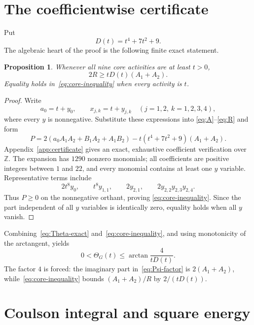 \documentclass[11pt]{article}
\newtheorem{proposition}[theorem]{Proposition}
\theoremstyle{remark}
\begin{document}
\section{The coefficientwise certificate}

Put
\begin{equation}\label{eq:D}
 D(t)=t^4+7t^2+9.
\end{equation}
The algebraic heart of the proof is the following finite exact statement.

\begin{proposition}\label{prop:certificate}
Whenever all nine core activities are at least $t>0$,
\begin{equation}\label{eq:core-inequality}
 2R\geq tD(t)(A_1+A_2).
\end{equation}
Equality holds in~\eqref{eq:core-inequality} when every activity is $t$.
\end{proposition}

\begin{proof}
Write
\[
 a_0=t+y_0,
 \qquad x_{j,k}=t+y_{j,k}
 \quad(j=1,2,\ k=1,2,3,4),
\]
where every $y$ is nonnegative.  Substitute these expressions into
\eqref{eq:A}--\eqref{eq:R} and form
\begin{equation}\label{eq:P}
 P=2(a_0A_1A_2+B_1A_2+A_1B_2)
   -t(t^4+7t^2+9)(A_1+A_2).
\end{equation}
Appendix~\ref{app:certificate} gives an exact, exhaustive coefficient
verification over $\mathbb Z$.  The expansion has $1290$ nonzero monomials;
all coefficients are positive integers between $1$ and $22$, and every
monomial contains at least one $y$ variable.  Representative terms include
\[
 2t^8y_0,
 \qquad t^8y_{1,1},
 \qquad 2y_{2,1},
 \qquad 2y_{2,2}y_{2,3}y_{2,4}.
\]
Thus $P\geq0$ on the nonnegative orthant, proving
\eqref{eq:core-inequality}.  Since the part independent of all $y$ variables
is identically zero, equality holds when all $y$ vanish.
\end{proof}

Combining~\eqref{eq:Theta-exact} and~\eqref{eq:core-inequality}, and using
monotonicity of the arctangent, yields
\begin{equation}\label{eq:phase-bound}
 0<\Theta_G(t)
 \leq\arctan\frac{4}{tD(t)}.
\end{equation}
The factor $4$ is forced: the imaginary part in~\eqref{eq:Psi-factor} is
$2(A_1+A_2)$, while~\eqref{eq:core-inequality} bounds
$(A_1+A_2)/R$ by $2/(tD(t))$.

\section{Coulson integral and square energy}
\end{document}
